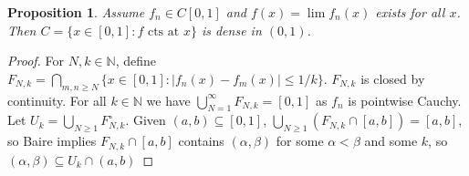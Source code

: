 \documentclass{article}
\theoremstyle{definition}
\theoremstyle{remark}
\theoremstyle{plain}
\newtheorem{prop}[defn]{Proposition}
\newcommand{\NN}{\mathbb{N}}
\begin{document}
\begin{prop}
    Assume $f_n\in C[0,1]$ and $f(x)=\lim f_n(x)$ exists for all $x$. Then $C=\{x\in[0,1]: f\text{ cts at }x\}$ is dense in $(0,1)$.
\end{prop}
\begin{proof}
    For $N,k\in \NN$, define $F_{N,k}=\bigcap_{m,n\ge N}\{x\in [0,1]:|f_n(x)-f_m(x)|\le 1/k\}$. $F_{N,k}$ is closed by continuity. For all $k\in\NN$ we have $\bigcup_{N=1}^\infty F_{N,k}=[0,1]$ as $f_n$ is pointwise Cauchy. Let $U_k=\bigcup_{N\ge 1}F_{N,k}^\circ$. Given $(a,b)\subseteq [0,1]$, $\bigcup_{N\ge 1}(F_{N,k}\cap [a,b])=[a,b]$, so Baire implies $F_{N,k}\cap [a,b]$ contains $(\alpha,\beta)$ for some $\alpha<\beta$ and some $k$, so $(\alpha,\beta)\subseteq U_k\cap (a,b)$
\end{proof}
\end{document}
